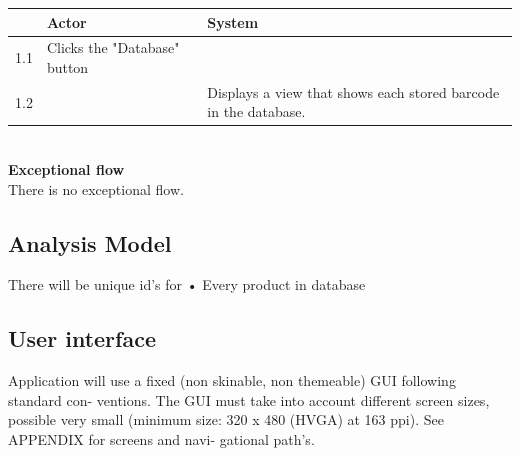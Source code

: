 \documentclass{report}
\begin{document}
\begin{enumerate}
    \begin{tabular}{ | p{1cm} | p{3cm} | p{4cm} |}
    \hline
      & Actor & System \\ \hline
    1.1 & Clicks the "Database" button & \\ \hline
    1.2 & & Displays a view that shows each stored barcode in the database. \\
    \hline
    \end{tabular} \\

    \textbf{Exceptional flow} \\ There is no exceptional flow. \

\end{enumerate}

\subsection{Analysis Model}

There will be unique id's for
• Every product in database

\subsection{User interface}
Application will use a fixed (non skinable, non themeable) GUI following standard con- ventions. The GUI must take into account different screen sizes, possible very small (minimum size: 320 x 480 (HVGA) at 163 ppi). See APPENDIX for screens and navi- gational path's.





\appendix
\end{document}
